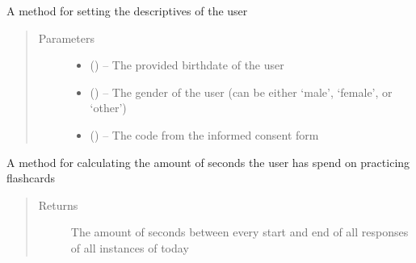 \documentclass[letterpaper,10pt,english]{sphinxmanual}
\begin{document}
\begin{fulllineitems}
\begin{fulllineitems}
\begin{quote}
\begin{description}
\end{description}\end{quote}

\end{fulllineitems}


\begin{fulllineitems}
\label{\detokenize{user:user.User.set_descriptives}}
A method for setting the descriptives of the user
\begin{quote}\begin{description}
\item[{Parameters}] \leavevmode\begin{itemize}
\item {} 
 () -- The provided birthdate of the user

\item {} 
 (\href{https://docs.python.org/2/library/string.html\#module-string}{}) -- The gender of the user (can be either `male', `female', or `other')

\item {} 
 (\href{https://docs.python.org/2/library/string.html\#module-string}{}) -- The code from the informed consent form

\end{itemize}

\end{description}\end{quote}

\end{fulllineitems}


\begin{fulllineitems}
\label{\detokenize{user:user.User.time_spend_today}}
A method for calculating the amount of seconds the user has spend on practicing flashcards
\begin{quote}\begin{description}
\item[{Returns}] \leavevmode
The amount of seconds between every start and end of all responses of all instances of today


\end{description}
\end{quote}
\end{fulllineitems}
\end{fulllineitems}
\end{document}
